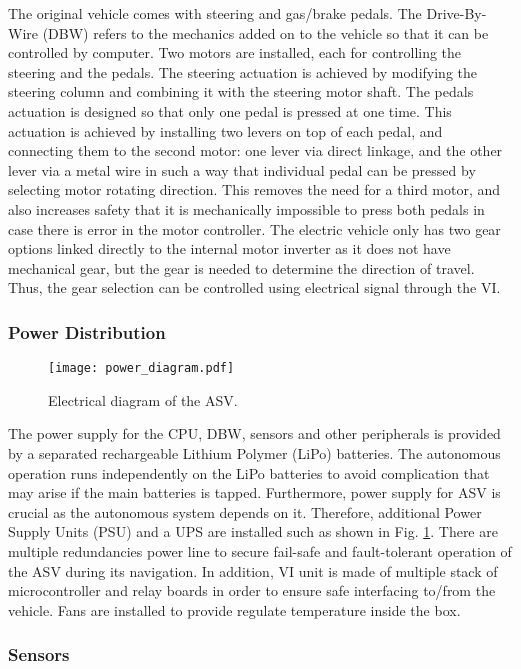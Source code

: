 \documentclass[10 pt,a4paper,conference]{IEEEtran}
\begin{document}
The original vehicle comes with steering and gas/brake pedals. The
Drive-By-Wire (DBW) refers to the mechanics added on to the vehicle so
that it can be controlled by computer. Two motors are installed, each
for controlling the steering and the pedals. The steering actuation is
achieved by modifying the steering column and combining it with the
steering motor shaft. The pedals actuation is designed so that only one
pedal is pressed at one time. This actuation is achieved by installing
two levers on top of each pedal, and connecting them to the second
motor: one lever via direct linkage, and the other lever via a metal
wire in such a way that individual pedal can be pressed by selecting
motor rotating direction. This removes the need for a third motor, and
also increases safety that it is mechanically impossible to press both
pedals in case there is error in the motor controller. The electric
vehicle only has two gear options linked directly to the internal motor
inverter as it does not have mechanical gear, but the gear is needed to
determine the direction of travel. Thus, the gear selection can be
controlled using electrical signal through the VI.

\subsubsection{Power Distribution}\label{power-distribution}

\begin{figure}[!t]
\centering
\texttt{[image: power\_diagram.pdf]}
\caption{Electrical diagram of the ASV.}
\label{fig_power}
\end{figure}

The power supply for the CPU, DBW, sensors and other peripherals is
provided by a separated rechargeable Lithium Polymer (LiPo) batteries.
The autonomous operation runs independently on the LiPo batteries to
avoid complication that may arise if the main batteries is tapped.
Furthermore, power supply for ASV is crucial as the autonomous system
depends on it. Therefore, additional Power Supply Units (PSU) and a UPS
are installed such as shown in Fig. \ref{fig_power}. There are multiple
redundancies power line to secure fail-safe and fault-tolerant operation
of the ASV during its navigation. In addition, VI unit is made of
multiple stack of microcontroller and relay boards in order to ensure
safe interfacing to/from the vehicle. Fans are installed to provide
regulate temperature inside the box.

\subsubsection{Sensors}\label{sensors}
\end{document}
